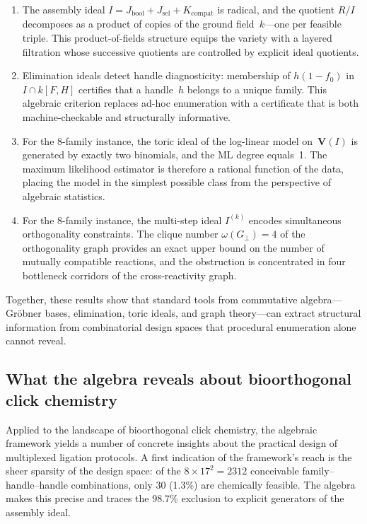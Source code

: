 \documentclass[preprint,12pt]{elsarticle}
\theoremstyle{definition}
\theoremstyle{remark}
\newcommand{\kk}{k}
\newcommand{\Var}{\mathbf{V}}
\begin{document}
\begin{enumerate}[label=(\roman*),nosep]
\item The assembly ideal $I = J_{\mathrm{bool}} + J_{\mathrm{sel}} +
  K_{\mathrm{compat}}$ is radical, and the quotient $R/I$ decomposes
  as a product of copies of the ground field~$\kk$---one per feasible
  triple.  This product-of-fields structure equips the variety with a
  layered filtration whose successive quotients are controlled by
  explicit ideal quotients.

\item Elimination ideals detect handle diagnosticity: membership of
  $h(1 - f_0)$ in $I \cap \kk[F,H]$ certifies that a handle~$h$
  belongs to a unique family.  This algebraic criterion replaces
  ad-hoc enumeration with a certificate that is both machine-checkable
  and structurally informative.

\item For the 8-family instance, the toric ideal of the
  log-linear model on~$\Var(I)$ is generated by exactly two
  binomials, and the ML degree equals~1.  The maximum likelihood
  estimator is therefore a rational function of the data, placing
  the model in the simplest possible class from the perspective of
  algebraic statistics.

\item For the 8-family instance, the multi-step ideal $I^{(k)}$
  encodes simultaneous orthogonality constraints.  The clique number
  $\omega(G_\perp) = 4$ of the orthogonality graph provides an exact
  upper bound on the number of mutually compatible reactions, and the
  obstruction is concentrated in four bottleneck corridors of the
  cross-reactivity graph.
\end{enumerate}

Together, these results show that standard tools from commutative
algebra---Gr\"obner bases, elimination, toric ideals, and graph
theory---can extract structural information from combinatorial
design spaces that procedural enumeration alone cannot reveal.

\subsection{What the algebra reveals about bioorthogonal click chemistry}

Applied to the landscape of bioorthogonal click chemistry, the
algebraic framework yields a number of concrete insights about
the practical design of multiplexed ligation protocols.
A first indication of the framework's reach is the sheer sparsity of
the design space: of the $8 \times 17^2 = 2312$ conceivable
family--handle--handle combinations, only 30 (1.3\%) are chemically
feasible.  The algebra makes this precise and traces the 98.7\%
exclusion to explicit generators of the assembly ideal.
\end{document}
